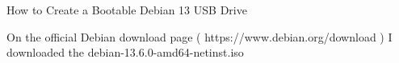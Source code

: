How to Create a Bootable Debian 13 USB Drive

On the official Debian download page ( https://www.debian.org/download ) 
I downloaded the debian-13.6.0-amd64-netinst.iso